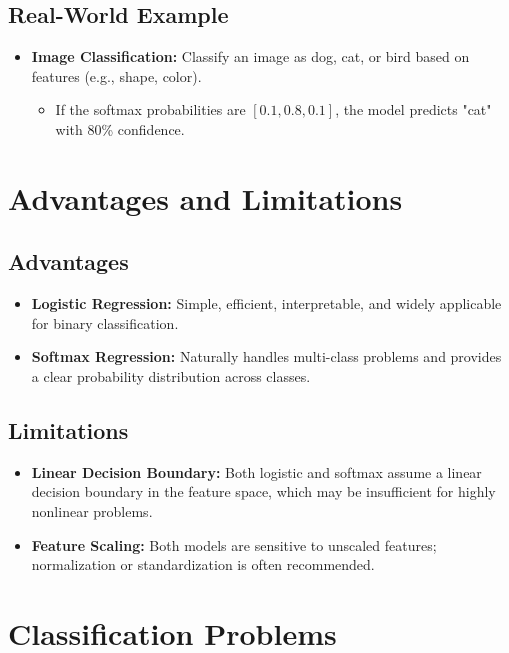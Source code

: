 \documentclass[10pt]{article}
\begin{document}
\subsection{Real-World Example}
\begin{itemize}
    \item \textbf{Image Classification:} Classify an image as dog, cat, or bird based on features (e.g., shape, color).
    \begin{itemize}
        \item If the softmax probabilities are \([0.1, 0.8, 0.1]\), the model predicts "cat" with 80\% confidence.
    \end{itemize}
\end{itemize}

\section{Advantages and Limitations}

\subsection{Advantages}
\begin{itemize}
    \item \textbf{Logistic Regression:} Simple, efficient, interpretable, and widely applicable for binary classification.
    \item \textbf{Softmax Regression:} Naturally handles multi-class problems and provides a clear probability distribution across classes.
\end{itemize}

\subsection{Limitations}
\begin{itemize}
    \item \textbf{Linear Decision Boundary:} Both logistic and softmax assume a linear decision boundary in the feature space, which may be insufficient for highly nonlinear problems.
    \item \textbf{Feature Scaling:} Both models are sensitive to unscaled features; normalization or standardization is often recommended.
\end{itemize}

\section{Classification Problems}
\end{document}
